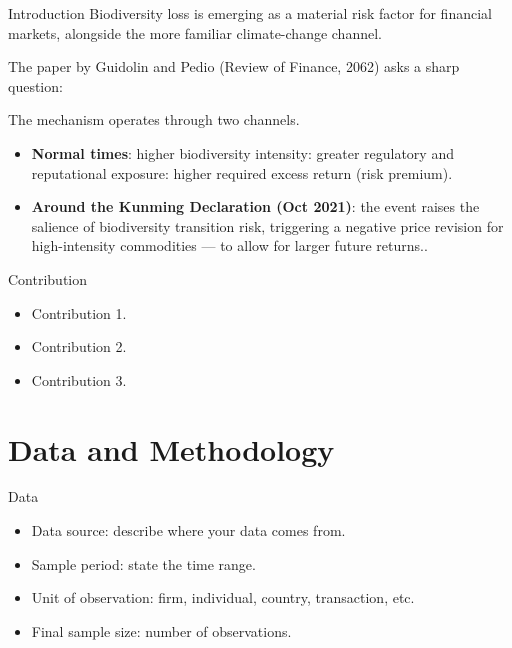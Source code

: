 \documentclass[aspectratio=169]{beamer}
\begin{document}
\begin{frame}{Introduction}
    Biodiversity loss is emerging as a material risk factor for financial markets, alongside the more familiar climate-change channel.

    The paper by Guidolin and Pedio (Review of Finance, 2062) asks a sharp question:


    The mechanism operates through two channels.
  \begin{itemize}
    \item \textbf{Normal times}: higher biodiversity intensity: greater regulatory and reputational exposure: higher required excess return (risk premium).
    \item \textbf{Around the Kunming Declaration (Oct 2021)}: the event raises the salience of biodiversity transition risk, triggering a negative price revision for high-intensity commodities — to allow for larger future returns..
  \end{itemize}
\end{frame}

\begin{frame}{Contribution}
  \begin{itemize}
    \item Contribution 1.
    \item Contribution 2.
    \item Contribution 3.
  \end{itemize}

\end{frame}

\section{Data and Methodology}

\begin{frame}{Data}
  \begin{itemize}
    \item Data source: describe where your data comes from.
    \item Sample period: state the time range.
    \item Unit of observation: firm, individual, country, transaction, etc.
    \item Final sample size: number of observations.
  \end{itemize}
\end{frame}
\end{document}
